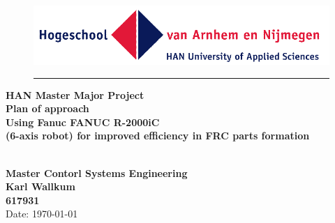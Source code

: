 \begin{titlepage}
	\begin{flushright}
	\begin{minipage}{\linewidth}
		\begin{figure}[H]
			\begin{flushright}
			\includegraphics[width=0.5\linewidth]{Images/HAN}
		\end{flushright}
		\hrule
		\end{figure}
		\begin{flushright}
			\large\textbf{ HAN Master Major Project}\\
			\vspace{20pt}
			\Huge\textbf{Plan of approach
			\\
			\vspace{10pt}
			Using Fanuc FANUC R-2000iC\\
			(6-axis robot) for improved efficiency in FRC parts formation }
		\end{flushright}
		\vspace{140pt}
		\begin{figure}[H]
		\begin{flushleft}
		\end{flushleft}	
		\end{figure}
		\begin{flushright}
			\LARGE \textbf
			{
			\\Master Contorl Systems Engineering
			\\Karl Wallkum 
			\\617931
			}
			\\Date: \today
		 		
		\end{flushright}
	\end{minipage}
	\end{flushright}

\end{titlepage}